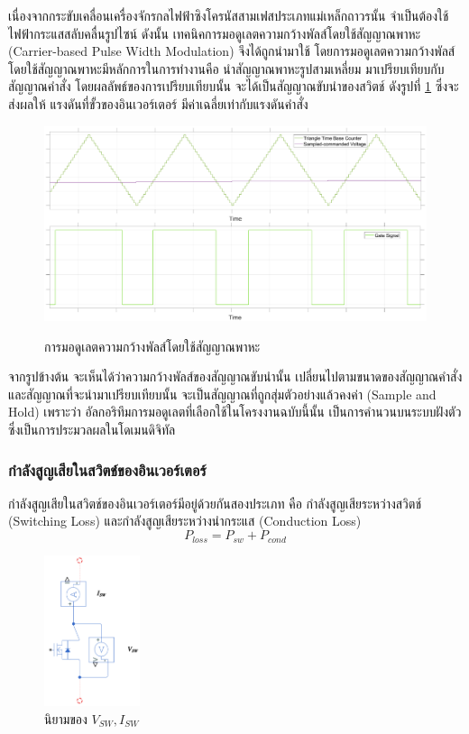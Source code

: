 \documentclass[11pt,a4paper]{article}
\begin{document}
เนื่องจากกระขับเคลื่อนเครื่องจักรกลไฟฟ้าซิงโครนัสสามเฟสประเภทแม่เหล็กถาวรนั้น จำเป็นต้องใช้ไฟฟ้ากระแสสลับคลื่นรูปไซน์ ดังนั้น เทคนิคการมอดูเลตความกว้างพัลส์โดยใช้สัญญาณพาหะ (Carrier-based Pulse Width Modulation) จึงได้ถูกนำมาใช้ โดยการมอดูเลตความกว้างพัลส์โดยใช้สัญญาณพาหะมีหลักการในการทำงานคือ นำสัญญาณพาหะรูปสามเหลี่ยม มาเปรียบเทียบกับสัญญาณคำสั่ง โดยผลลัพธ์ของการเปรียบเทียบนั้น จะได้เป็นสัญญาณขับนำของสวิตช์ ดังรูปที่ \ref{spwmgraph} ซึ่งจะส่งผลให้ แรงดันที่ขั้วของอินเวอร์เตอร์ มีค่าเฉลี่ยเท่ากับแรงดันคำสั่ง

\begin{figure}[!h]
    \includegraphics[width=\textwidth]{spwm.eps}
    \label{spwmgraph}
    \caption{การมอดูเลตความกว้างพัลส์โดยใช้สัญญาณพาหะ}
\end{figure}

จากรูปข้างต้น จะเห็นได้ว่าความกว้างพัลส์ของสัญญาณขับนำนั้น เปลี่ยนไปตามขนาดของสัญญาณคำสั่ง และสัญญาณที่จะนำมาเปรียบเทียบนั้น จะเป็นสัญญาณที่ถูกสุ่มตัวอย่างแล้วคงค่า (Sample and Hold) เพราะว่า อัลกอริทึมการมอดูเลตที่เลือกใช้ในโครงงานฉบับนี้นั้น เป็นการคำนวนบนระบบฝังตัว ซึ่งเป็นการประมวลผลในโดเมนดิจิทัล

\subsubsection{กำลังสูญเสียในสวิตช์ของอินเวอร์เตอร์}
กำลังสูญเสียในสวิตช์ของอินเวอร์เตอร์มีอยู่ด้วยกันสองประเภท คือ กำลังสูญเสียระหว่างสวิตช์ (Switching Loss) และกำลังสูญเสียระหว่างนำกระแส (Conduction Loss)
\begin{equation}
    P_{loss} = P_{sw} + P_{cond}
\end{equation}

\begin{figure}[h]
    \centering
    \includegraphics[width=0.25\textwidth]{vsw_isw.png}
    \caption{นิยามของ $V_{SW}, I_{SW}$}
    \label{vsw_isw_definition}
\end{figure}
\end{document}
